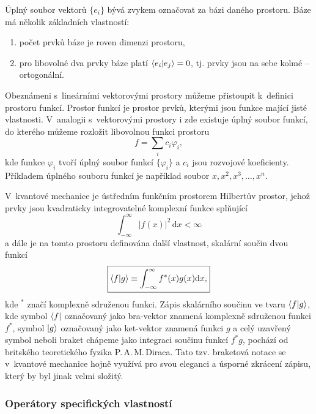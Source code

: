 Úplný soubor vektorů $\{e_i\}$ bývá zvykem označovat za bázi daného prostoru. Báze má několik základních vlastností:
\begin{enumerate}
\item počet prvků báze je roven dimenzi prostoru,
\item pro libovolné dva prvky báze platí $\braket{e_i|e_j} = 0$, tj. prvky jsou na sebe kolmé -- ortogonální.
\end{enumerate}

Obeznámeni s~lineárními vektorovými prostory můžeme přistoupit k~definici prostoru funkcí. Prostor funkcí je prostor prvků, kterými jsou funkce mající jisté vlastnosti. V~analogii s~vektorovými prostory i zde existuje úplný soubor funkcí, do kterého můžeme rozložit libovolnou funkci prostoru
\begin{equation}
f = \sum_i c_i \varphi_i,
\label{rov:RozvojDoBazeFunkci}
\end{equation}
kde funkce $\varphi_i$ tvoří úplný soubor funkcí $\{\varphi_i\}$ a $c_i$ jsou rozvojové koeficienty. Příkladem úplného souboru funkcí je například soubor $x, x^2, x^3, \dots, x^n$.

V~kvantové mechanice je ústředním funkčním prostorem Hilbertův prostor, jehož prvky jsou kvadraticky integrovatelné komplexní funkce  splňující
\begin{equation}
\int_{-\infty}^{\infty} |f(x)|^2 \,\mathrm{d}x < \infty
\label{rov:KvandarickaIntegrovatelnost}
\end{equation} 
a dále je na tomto prostoru definována další vlastnost, skalární součin dvou funkcí
\begin{equation}
\boxed{\braket{f|g} \equiv \int_{-\infty}^{\infty} f^{\ast}(x) g(x) \mathrm{d}x,}
\label{rov:SkalarniSoucinFci}
\end{equation}
kde $^{\ast}$ značí komplexně sdruženou funkci. Zápis skalárního součinu ve tvaru $\braket{f|g}$, kde symbol $\bra{f}$ označovaný jako bra-vektor znamená komplexně sdruženou funkci $f^{\ast}$, symbol $\ket{g}$ označovaný jako ket-vektor znamená funkci $g$ a celý uzavřený symbol neboli braket chápeme jako integraci součinu funkcí $f^{\ast}g$, pochází od britského teoretického fyzika P.\,A.\,M.\,Diraca. Tato tzv. braketová notace se v~kvantové mechanice hojně využívá pro svou eleganci a úsporné zkrácení zápisu, který by byl jinak velmi složitý.



\subsubsection{Operátory specifických vlastností}
\label{kap:OperatorySpecifickychVlastnosti}


